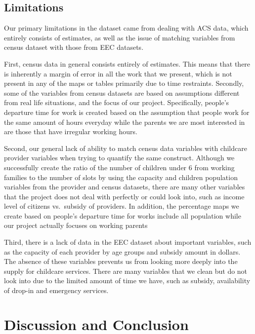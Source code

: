 \documentclass[10pt,letterpaper]{article}
\begin{document}
\subsection{Limitations}\label{limitations}

Our primary limitations in the dataset came from dealing with ACS data,
which entirely consists of estimates, as well as the issue of matching
variables from census dataset with those from EEC datasets.

First, census data in general consists entirely of estimates. This means
that there is inherently a margin of error in all the work that we
present, which is not present in any of the maps or tables primarily due
to time restraints. Secondly, some of the variables from census datasets
are based on assumptions different from real life situations, and the
focus of our project. Specifically, people's departure time for work is
created based on the assumption that people work for the same amount of
hours everyday while the parents we are most interested in are those
that have irregular working hours.

Second, our general lack of ability to match census data variables with
childcare provider variables when trying to quantify the same construct.
Although we successfully create the ratio of the number of children
under 6 from working families to the number of slots by using the
capacity and children population variables from the provider and census
datasets, there are many other variables that the project does not deal
with perfectly or could look into, such as income level of citizens
vs.~subsidy of providers. In addition, the percentage maps we create
based on people's departure time for works include all population while
our project actually focuses on working parents

Third, there is a lack of data in the EEC dataset about important
variables, such as the capacity of each provider by age groups and
subsidy amount in dollars. The absence of these variables prevents us
from looking more deeply into the supply for childcare services. There
are many variables that we clean but do not look into due to the limited
amount of time we have, such as subsidy, availability of drop-in and
emergency services.

\section{Discussion and Conclusion}\label{discussion-and-conclusion}
\end{document}
